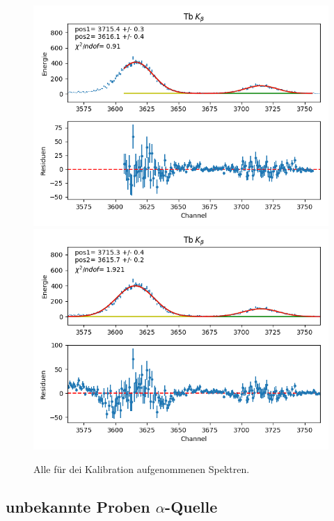\documentclass[12pt,a4paper]{article}
\begin{document}
\begin{figure}[H]
\centering
\includegraphics[scale=0.8]{Bilder/alpha/tb_beta_1.png}
\includegraphics[scale=0.8]{Bilder/alpha/tb_beta_2.png}
\caption{Alle für dei Kalibration aufgenommenen Spektren.}
\label{fig:kal_alles}
\end{figure}
\subsection{unbekannte Proben $\alpha$-Quelle}
\end{document}
